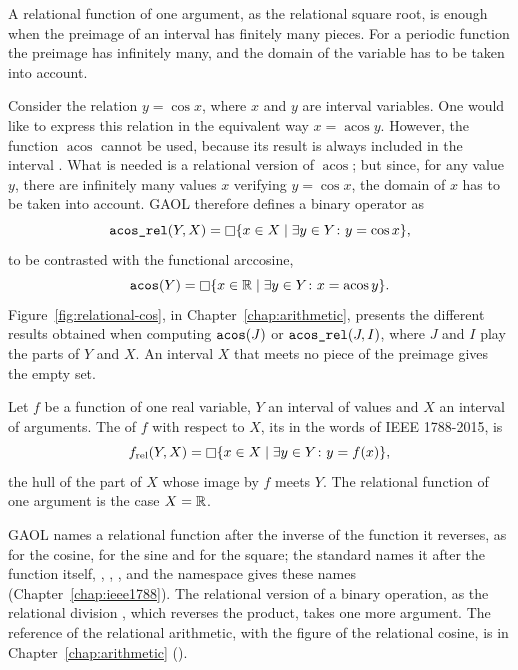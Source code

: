\documentclass[12pt,a4paper,twoside,openright]{book}
\begin{document}
\medskip
A relational function of one argument, as the relational square root, is
enough when the preimage of an interval has finitely many pieces. For a
periodic function the preimage has infinitely many, and the domain of the
variable has to be taken into account.

\begin{Ex}\label{ex:acos-relational}
Consider the relation $y=\cos x$, where $x$ and $y$ are interval variables.
One would like to express this relation in the equivalent way
$x=\operatorname{acos} y$. However, the function $\operatorname{acos}$
cannot be used, because its result is always included in the interval
. What is needed is a relational version of
$\operatorname{acos}$; but since, for any value $y$, there are infinitely
many values $x$ verifying $y=\cos x$, the domain of $x$ has to be taken
into account. GAOL therefore defines a binary operator  as
\begin{equation*}
  \texttt{acos\_rel}(Y, X)=\mathop{\Box} \{x\in X\mid\exists y\in Y\colon y=\cos x\},
\end{equation*}
to be contrasted with the functional arccosine,
\begin{equation*}
  \texttt{acos}(Y)=\mathop{\Box} \{x\in\mathbb{R}\mid\exists y\in Y\colon
    x=\operatorname{acos} y\}.
\end{equation*}
Figure~\ref{fig:relational-cos}, in Chapter~\ref{chap:arithmetic}, presents
the different results obtained when computing $\texttt{acos}(J)$ or
$\texttt{acos\_rel}(J, I)$, where $J$ and $I$ play the parts of $Y$ and $X$.
An interval $X$ that meets no piece of the
preimage gives the empty set.\newinvfive
\end{Ex}

\begin{Def}\label{def:relational}
Let $f$ be a function of one real variable, $Y$ an interval of values and
$X$ an interval of arguments. The  of $f$ with
respect to $X$, its  in the words of IEEE 1788-2015,
is
\begin{equation*}
  f_{\mathrm{rel}}(Y, X)=\mathop{\Box} \{x\in X\mid\exists y\in Y\colon y=f(x)\},
\end{equation*}
the hull of the part of $X$ whose image by $f$ meets $Y$. The relational
function of one argument is the case $X=\mathbb{R}$.
\end{Def}

GAOL names a relational function after the inverse of the function it
reverses, as  for the cosine,  for the sine
and  for the square; the standard names it after the
function itself, , , , and the
namespace  gives these names
(Chapter~\ref{chap:ieee1788}). The relational version of a binary
operation, as the relational division , which reverses the
product, takes one more argument. The reference of the relational
arithmetic, with the figure of the relational cosine, is in
Chapter~\ref{chap:arithmetic} ().
\end{document}
